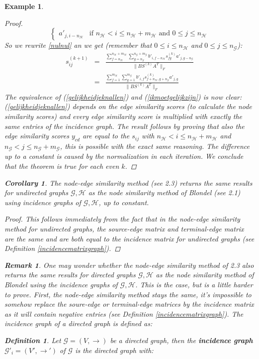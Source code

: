\documentclass[a4paper,11pt]{report}
\newtheorem{example}[theorem]{Example}
\newtheorem{definition}[theorem]{Definition}
\newtheorem{corollary}[theorem]{Corollary}
\newtheorem{remark}[theorem]{Remark}
\newcommand{\graf}{\mathscr{G}}
\newcommand{\grafeen}{\mathscr{H}}
\newcommand{\hgraf}{\mathcal{G}}
\newcommand{\hgrafeen}{\mathcal{H}}
\begin{document}
\begin{example}
\begin{proof}
$$\begin{cases}
a'_{j,i-n_\hgrafeen} & \text{if } n_\hgrafeen < i \leq n_\hgrafeen + m_\hgrafeen \text{ and } 0 \leq j \leq n_\hgrafeen\end{cases} $$
So we rewrite \ref{nulnul} an we get (remember that $0 \leq i \leq n_\hgrafeen$
 and $0 \leq j \leq n_\hgraf$):
\begin{eqnarray}
  s^{(k+1)}_{ij} &=& \frac{\sum^{n_\hgrafeen + m_\hgrafeen}_{f=n_\hgrafeen}\sum^{n_\hgraf + m_\hgraf}_{g=n_\hgraf} 
b'_{i,f-n_\hgrafeen}s^{(k)}_{fg}a'_{j,g-n_\hgraf}}{\|BS^{(k)}A^T\|_F}\\
 &=& \frac{\sum^{m_\hgrafeen}_{f=1}\sum^{m_\hgraf}_{g=1} 
b'_{i,f}s^{(k)}_{f+n_\hgrafeen,g+n_\hgraf}a'_{j,g}}{\|BS^{(k)}A^T\|_F}\label{gelijkheidjeknallen}
\end{eqnarray}
The equivalence of (\ref{gelijkheidjeknallen}) and (\ref{ikmoetgelijkzijn}) is 
now clear: (\ref{gelijkheidjeknallen}) depends on the edge similarity scores (to 
calculate the node similarity scores) and every edge similarity score is 
multiplied with exactly the same entries of the incidence graph. The result 
follows by proving that also the edge similarity scores $y_{cd}$ are equal to 
the $s_{ij}$ with $n_\hgrafeen < i \leq n_\hgrafeen + m_\hgrafeen$ and $n_\hgraf < j \leq n_\hgraf + 
m_\hgraf$, this is possible with the exact same reasoning. The difference up to 
a constant is caused by the normalization in each iteration. We conclude that 
the theorem is true for each even $k$.
 \end{proof}

 \begin{corollary}\label{gelijktjekdj}
   The node-edge similarity method (see 2.3) returns the same results for undirected graphs $\graf, \grafeen$ as
   the node similarity method of Blondel (see 2.1) using incidence graphs of $\graf, \grafeen$, up to constant. 
 \end{corollary}

\begin{proof}
  This follows immediately from the fact that in the node-edge similarity method 
  for undirected graphs, the source-edge matrix and terminal-edge matrix are the 
  same and are both equal to the incidence matrix for undirected graphs (see Definition \ref{incidencematrixgraph}).
\end{proof}
 
 \begin{remark}
   One may wonder whether the node-edge similarity method of 2.3 also returns 
   the same results for directed graphs $\graf, \grafeen$ as the node similarity 
   method of Blondel using the incidence graphs of $\graf, \grafeen$. This is the case, but is a 
   little harder to prove. First, the node-edge similarity method stays the 
   same, it's impossible to somehow replace the soure-edge or terminal-edge 
   matrices by the incidence matrix as it will contain negative entries (see Definition 
   \ref{incidencematrixgraph}). The incidence graph of a directed graph is 
   defined as:
   \begin{definition}
  Let $\graf = (V,\to)$ be a directed graph, then the \textbf{incidence graph} $\graf'_i =(V', \to')$ 
  of $\graf$ is the directed graph with:
   

\end{definition}
\end{remark}
\end{example}
\end{document}
